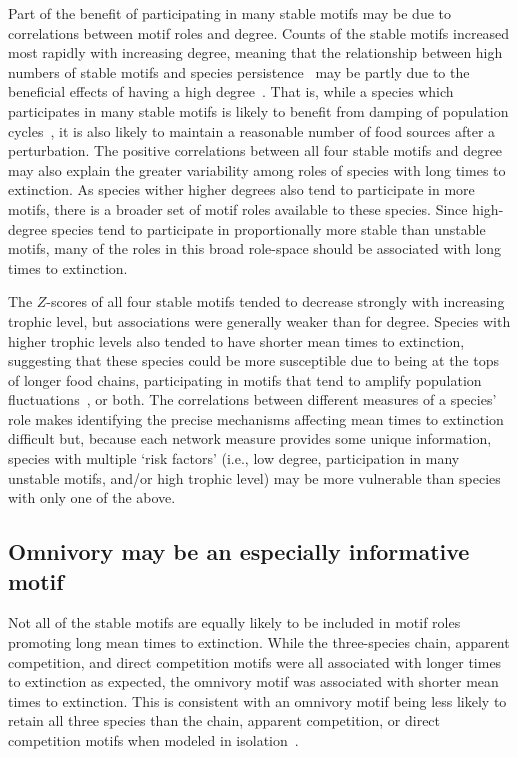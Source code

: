 \documentclass[12pt]{article}
\begin{document}
\begin{spacing}{2.0}
        
        Part of the benefit of participating in many stable motifs may be due to correlations between motif roles and degree.
        Counts of the stable motifs increased most rapidly with increasing degree, meaning that the relationship between high numbers of stable motifs and species persistence~\citep{Stouffer2007,Borrelli2015a} may be partly due to the beneficial effects of having a high degree~\citep{Cirtwill2016a}.
		That is, while a species which participates in many stable motifs is likely to benefit from damping of population cycles~\citep{Borrelli2015a}, it is also likely to maintain a reasonable number of food sources after a perturbation.
		The positive correlations between all four stable motifs and degree may also explain the greater variability among roles of species with long times to extinction.
		As species wither higher degrees also tend to participate in more motifs, there is a broader set of motif roles available to these species.
		Since high-degree species tend to participate in proportionally more stable than unstable motifs, many of the roles in this broad role-space should be associated with long times to extinction.

		
        The $Z$-scores of all four stable motifs tended to decrease strongly with increasing trophic level, but associations were generally weaker than for degree.
        Species with higher trophic levels also tended to have shorter mean times to extinction, suggesting that these species could be more susceptible due to being at the tops of longer food chains, participating in motifs that tend to amplify population fluctuations~\citep{Borrelli2015a}, or both.
        The correlations between different measures of a species' role makes identifying the precise mechanisms affecting mean times to extinction difficult but, because each network measure provides some unique information, species with multiple `risk factors' (i.e., low degree, participation in many unstable motifs, and/or high trophic level) may be more vulnerable than species with only one of the above.

        
    \subsection*{Omnivory may be an especially informative motif}
	    
        Not all of the stable motifs are equally likely to be included in motif roles promoting long mean times to extinction.
        While the three-species chain, apparent competition, and direct competition motifs were all associated with longer times to extinction as expected, the omnivory motif was associated with shorter mean times to extinction. 
        This is consistent with an omnivory motif being less likely to retain all three species than the chain, apparent competition, or direct competition motifs when modeled in isolation~\citep{Borrelli2015a}. 



\end{spacing}
\end{document}
